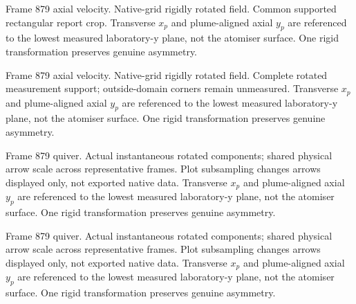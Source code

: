 \caption{Frame 879 axial velocity. Native-grid rigidly rotated field. Common supported rectangular report crop. Transverse $x_p$ and plume-aligned axial $y_p$ are referenced to the lowest measured laboratory-y plane, not the atomiser surface. One rigid transformation preserves genuine asymmetry.}

\caption{Frame 879 axial velocity. Native-grid rigidly rotated field. Complete rotated measurement support; outside-domain corners remain unmeasured. Transverse $x_p$ and plume-aligned axial $y_p$ are referenced to the lowest measured laboratory-y plane, not the atomiser surface. One rigid transformation preserves genuine asymmetry.}

\caption{Frame 879 quiver. Actual instantaneous rotated components; shared physical arrow scale across representative frames. Plot subsampling changes arrows displayed only, not exported native data. Transverse $x_p$ and plume-aligned axial $y_p$ are referenced to the lowest measured laboratory-y plane, not the atomiser surface. One rigid transformation preserves genuine asymmetry.}

\caption{Frame 879 quiver. Actual instantaneous rotated components; shared physical arrow scale across representative frames. Plot subsampling changes arrows displayed only, not exported native data. Transverse $x_p$ and plume-aligned axial $y_p$ are referenced to the lowest measured laboratory-y plane, not the atomiser surface. One rigid transformation preserves genuine asymmetry.}
